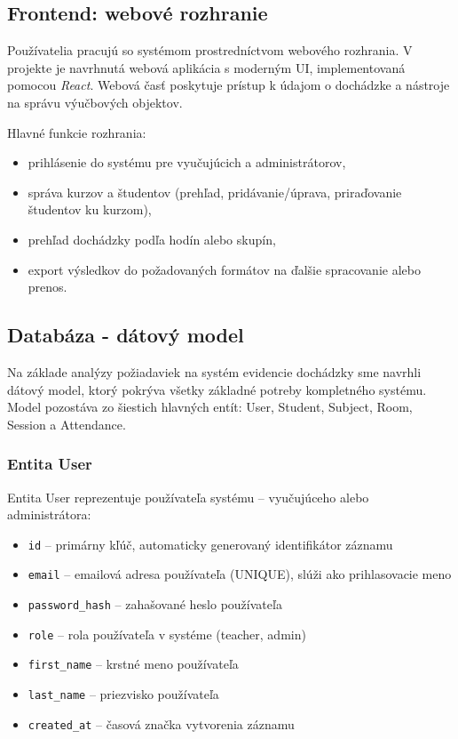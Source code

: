 \subsection{Frontend: webové rozhranie}
Používatelia pracujú so systémom prostredníctvom webového rozhrania. V projekte je navrhnutá webová aplikácia s moderným UI, implementovaná pomocou \textit{React}. Webová časť poskytuje prístup k údajom o dochádzke a nástroje na správu výučbových objektov.

Hlavné funkcie rozhrania:
\begin{itemize}
  \item prihlásenie do systému pre vyučujúcich a administrátorov,
  \item správa kurzov a študentov (prehľad, pridávanie/úprava, priraďovanie študentov ku kurzom),
  \item prehľad dochádzky podľa hodín alebo skupín,
  \item export výsledkov do požadovaných formátov na ďalšie spracovanie alebo prenos.
\end{itemize}


\subsection{Databáza - dátový model}

Na základe analýzy požiadaviek na systém evidencie dochádzky sme navrhli dátový model, ktorý pokrýva všetky základné potreby kompletného systému. Model pozostáva zo šiestich hlavných entít: User, Student, Subject, Room, Session a Attendance.

\subsubsection{Entita User}

Entita User reprezentuje používateľa systému -- vyučujúceho alebo administrátora:

\begin{itemize}
    \item \texttt{id} -- primárny kľúč, automaticky generovaný identifikátor záznamu
    \item \texttt{email} -- emailová adresa používateľa (UNIQUE), slúži ako prihlasovacie meno
    \item \texttt{password\_hash} -- zahašované heslo používateľa
    \item \texttt{role} -- rola používateľa v systéme (teacher, admin)
    \item \texttt{first\_name} -- krstné meno používateľa
    \item \texttt{last\_name} -- priezvisko používateľa
    \item \texttt{created\_at} -- časová značka vytvorenia záznamu
\end{itemize}

